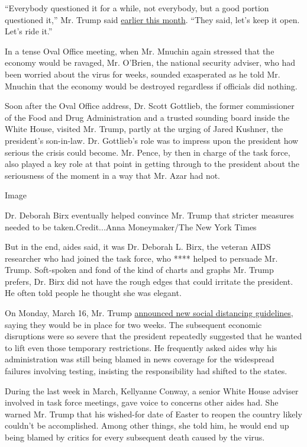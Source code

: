 ``Everybody questioned it for a while, not everybody, but a good portion
questioned it,'' Mr. Trump said
\href{https://www.whitehouse.gov/briefings-statements/remarks-president-trump-vice-president-pence-members-coronavirus-task-force-press-briefing-17/}{earlier
this month}. ``They said, let's keep it open. Let's ride it.''

In a tense Oval Office meeting, when Mr. Mnuchin again stressed that the
economy would be ravaged, Mr. O'Brien, the national security adviser,
who had been worried about the virus for weeks, sounded exasperated as
he told Mr. Mnuchin that the economy would be destroyed regardless if
officials did nothing.

Soon after the Oval Office address, Dr. Scott Gottlieb, the former
commissioner of the Food and Drug Administration and a trusted sounding
board inside the White House, visited Mr. Trump, partly at the urging of
Jared Kushner, the president's son-in-law. Dr. Gottlieb's role was to
impress upon the president how serious the crisis could become. Mr.
Pence, by then in charge of the task force, also played a key role at
that point in getting through to the president about the seriousness of
the moment in a way that Mr. Azar had not.

Image

Dr. Deborah Birx eventually helped convince Mr. Trump that stricter
measures needed to be taken.Credit...Anna Moneymaker/The New York Times

But in the end, aides said, it was Dr. Deborah L. Birx, the veteran AIDS
researcher who had joined the task force, who **** helped to persuade
Mr. Trump. Soft-spoken and fond of the kind of charts and graphs Mr.
Trump prefers, Dr. Birx did not have the rough edges that could irritate
the president. He often told people he thought she was elegant.

On Monday, March 16, Mr. Trump
\href{https://www.nytimes.com/2020/03/16/us/politics/trump-coronavirus-guidelines.html}{announced
new social distancing guidelines}, saying they would be in place for two
weeks. The subsequent economic disruptions were so severe that the
president repeatedly suggested that he wanted to lift even those
temporary restrictions. He frequently asked aides why his administration
was still being blamed in news coverage for the widespread failures
involving testing, insisting the responsibility had shifted to the
states.

During the last week in March, Kellyanne Conway, a senior White House
adviser involved in task force meetings, gave voice to concerns other
aides had. She warned Mr. Trump that his wished-for date of Easter to
reopen the country likely couldn't be accomplished. Among other things,
she told him, he would end up being blamed by critics for every
subsequent death caused by the virus.


